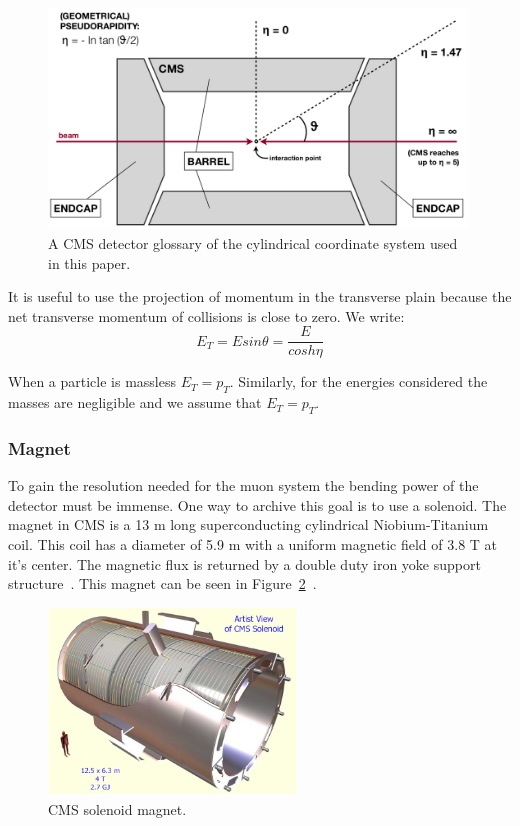 \begin{figure}[htb]
\centering
\includegraphics[width=0.99\textwidth]{Experiment/DetectorGlossary.png}
\caption{A CMS detector glossary of the cylindrical coordinate system used in this paper.~\cite{Pandolfi_talk}}
\label{fig:CMS_detector_glossary}
\end{figure}

It is useful to use the projection of momentum in the transverse plain because the net transverse momentum of collisions is close to zero.  We write:
\begin{equation} E_T = E sin \theta = \dfrac{E}{cosh\eta} \label{eq:transverse_energy}\end{equation}

When a particle is massless $E_T=p_T$.  Similarly, for the energies considered the masses are negligible and we assume that $E_T=p_T$.

\subsubsection{Magnet}

To gain the resolution needed for the muon system the bending power of the detector must be immense.  One way to archive this goal is to use a solenoid.  The magnet in CMS is a 13 m long superconducting cylindrical Niobium-Titanium coil.  This coil has a diameter of 5.9 m with a uniform magnetic field of 3.8 T at it's center.  The magnetic flux is returned by a double duty iron yoke support structure~\cite{Magnet_CMS}. This magnet can be seen in Figure~\ref{fig:CMS_solenoid_magnet}~\cite{cms_solenoid_magnet}.

\begin{figure}[htb]
\centering
\includegraphics[width=0.59\textwidth]{Experiment/CMS-solenoid-magnet.jpg}
\caption{CMS solenoid magnet.~\cite{cms_solenoid_magnet}}
\label{fig:CMS_solenoid_magnet}
\end{figure}


